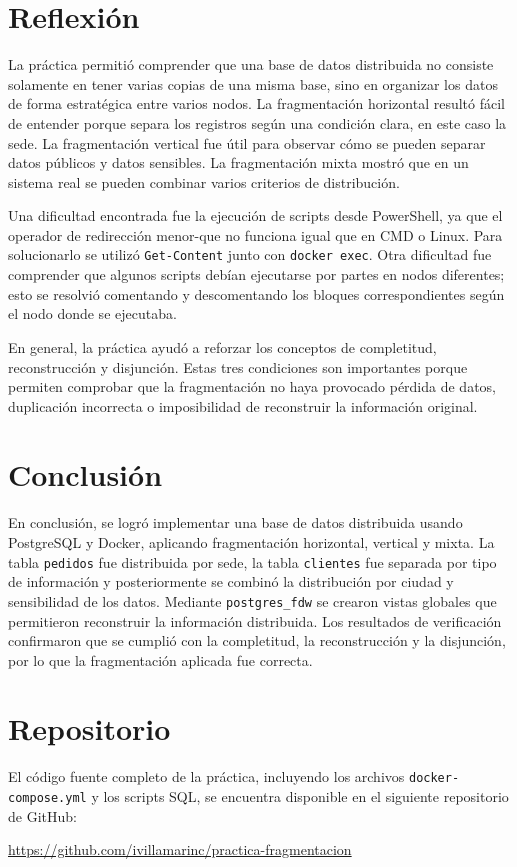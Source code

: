 \documentclass[conference]{IEEEtran}
\begin{document}
\section{Reflexión}
La práctica permitió comprender que una base de datos distribuida no consiste solamente en tener varias copias de una misma base, sino en organizar los datos de forma estratégica entre varios nodos. La fragmentación horizontal resultó fácil de entender porque separa los registros según una condición clara, en este caso la sede. La fragmentación vertical fue útil para observar cómo se pueden separar datos públicos y datos sensibles. La fragmentación mixta mostró que en un sistema real se pueden combinar varios criterios de distribución.

Una dificultad encontrada fue la ejecución de scripts desde PowerShell, ya que el operador de redirección menor-que no funciona igual que en CMD o Linux. Para solucionarlo se utilizó \texttt{Get-Content} junto con \texttt{docker exec}. Otra dificultad fue comprender que algunos scripts debían ejecutarse por partes en nodos diferentes; esto se resolvió comentando y descomentando los bloques correspondientes según el nodo donde se ejecutaba.

En general, la práctica ayudó a reforzar los conceptos de completitud, reconstrucción y disjunción. Estas tres condiciones son importantes porque permiten comprobar que la fragmentación no haya provocado pérdida de datos, duplicación incorrecta o imposibilidad de reconstruir la información original.

\section{Conclusión}
En conclusión, se logró implementar una base de datos distribuida usando PostgreSQL y Docker, aplicando fragmentación horizontal, vertical y mixta. La tabla \texttt{pedidos} fue distribuida por sede, la tabla \texttt{clientes} fue separada por tipo de información y posteriormente se combinó la distribución por ciudad y sensibilidad de los datos. Mediante \texttt{postgres\_fdw} se crearon vistas globales que permitieron reconstruir la información distribuida. Los resultados de verificación confirmaron que se cumplió con la completitud, la reconstrucción y la disjunción, por lo que la fragmentación aplicada fue correcta.

\section*{Repositorio}
El código fuente completo de la práctica, incluyendo los archivos \texttt{docker-compose.yml} y los scripts SQL, se encuentra disponible en el siguiente repositorio de GitHub:
\begin{center}
\url{https://github.com/ivillamarinc/practica-fragmentacion}
\end{center}
\end{document}
